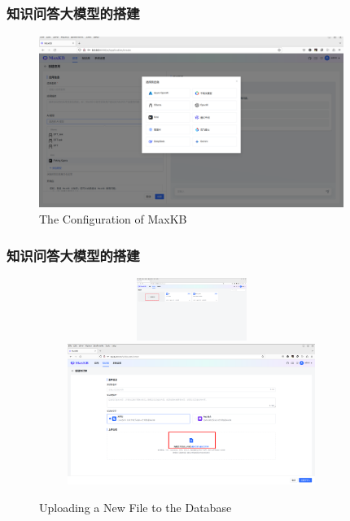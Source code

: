 \begin{frame}
	\frametitle{知识问答大模型的搭建}
\begin{figure}[h!]
\centering
\vskip -8pt
\includegraphics[height=2.20in,width=3.90in,viewport=0 0 1850 1041,clip]{Figures/MaxKB_Chose-Model.png}
\caption{\tiny\textrm{The Configuration of MaxKB}}%
\label{Fig:MaxKB_Chose-Model}
\end{figure}
\end{frame}

\begin{frame}
	\frametitle{知识问答大模型的搭建}
\begin{figure}[h!]
\centering
\vskip -8pt
\includegraphics[height=0.80in,width=3.90in,viewport=0 650 1850 1054,clip]{Figures/MaxKB_NewDatabase.png}
\includegraphics[height=1.80in,width=3.90in,viewport=0 0 1850 880,clip]{Figures/MaxKB_Database.png}
\caption{\tiny\textrm{Uploading a New File to the Database}}%
\label{Fig:MaxKB_Database}
\end{figure}
\end{frame}

